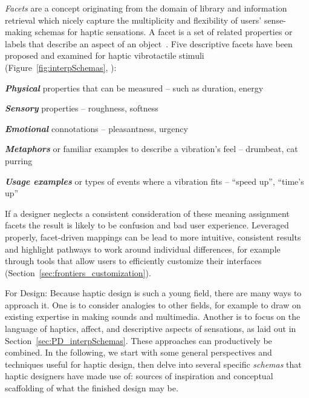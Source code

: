     
\textit{Facets} are a concept originating from the domain of library and information retrieval which nicely capture the multiplicity and flexibility of users' sense-making schemas for haptic sensations. A facet is a set of related properties or labels that describe an aspect of an object~\cite{facetedbrowsing2010}. Five descriptive facets have been proposed and examined for haptic vibrotactile stimuli (Figure~\ref{fig:interpSchemas}, \cite{seifi2015vibviz}):
 
    \textit{\textbf{Physical}} properties that can be measured -- such as duration, energy
    
    \textit{\textbf{Sensory}} properties -- roughness, softness
    
    \textit{\textbf{Emotional}} connotations -- pleasantness, urgency 
        
    \textit{\textbf{Metaphors}} or familiar examples to describe a vibration's feel -- drumbeat, cat purring
    
    \textit{\textbf{Usage examples}} or types of events where a vibration fits -- ``speed up'', ``time's up''

\vspace{0.05in} 
\noindent
If a designer neglects a consistent consideration of these meaning assignment facets %
the result is likely to be confusion and bad user experience.
Leveraged properly, facet-driven 
mappings can be lead to more intuitive, consistent results and highlight pathways to work around individual differences, for example through tools that allow users to efficiently customize their interfaces (Section~\ref{sec:frontiers_customization}).

For Design:
Because haptic design is such a young field, there are many ways to approach it.
One is to consider analogies to other fields, for example to draw on existing expertise in making sounds and multimedia.
Another is to focus on the language of haptics, affect, and descriptive aspects of sensations, as laid out in Section~\ref{sec:PD_interpSchemas}. 
These approaches can productively be combined.
In the following, we start with some general perspectives and techniques useful for haptic design, then delve into several specific \textit{schemas} that haptic designers have made use of: 
sources of inspiration and conceptual scaffolding of what the finished design may be.


